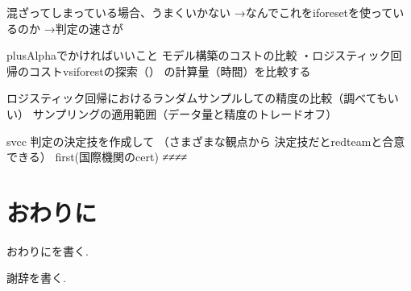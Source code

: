 \documentclass{css}
\begin{document}
混ざってしまっている場合、うまくいかない
→なんでこれをiforesetを使っているのか
→判定の速さが

plusAlphaでかければいいこと
モデル構築のコストの比較
・ロジスティック回帰のコストvsiforestの探索（）
の計算量（時間）を比較する

ロジスティック回帰におけるランダムサンプルしての精度の比較（調べてもいい）
サンプリングの適用範囲（データ量と精度のトレードオフ）

svcc 判定の決定技を作成して
（さまざまな観点から
決定技だとredteamと合意できる）
first(国際機関のcert)
≠≠≠≠


\section{おわりに}
おわりにを書く.

\begin{acknowledgment}
謝辞を書く.
\end{acknowledgment}

\begin{thebibliography}{10}

\end{thebibliography}
\end{document}
